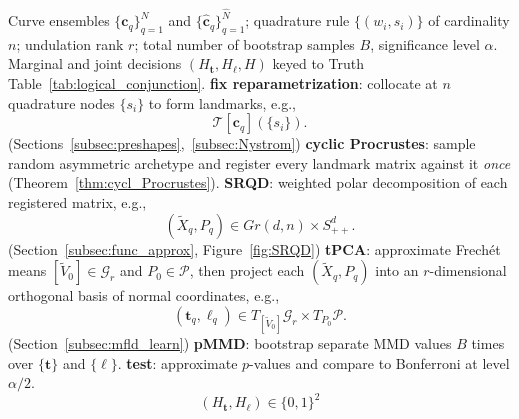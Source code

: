 \begin{algorithm}[ht]
\caption{Pseudo-code for explainable binary classification of separable shape ensembles.}
\label{alg:pipeline}
\begin{algorithmic}[1]
\Require Curve ensembles $\lbrace \boldsymbol{c}_q \rbrace_{q=1}^{N}$ and $\lbrace \widehat{\boldsymbol{c}}_q \rbrace_{q=1}^{\widehat{N}}$; quadrature rule $\lbrace (w_i,s_i)\rbrace$ of cardinality $n$; undulation rank $r$; total number of bootstrap samples $B$, significance level $\alpha$.
\Ensure Marginal and joint decisions $(H_{\boldsymbol{t}}, H_{\boldsymbol{\ell}}, H)$ keyed to Truth Table~\ref{tab:logical_conjunction}.
\State \textbf{fix reparametrization}: collocate at $n$ quadrature nodes $\lbrace s_i \rbrace$ to form landmarks, e.g.,
$$
\mathcal{T}[\boldsymbol{c}_q](\lbrace s_i \rbrace).
$$ (Sections~\ref{subsec:preshapes},~\ref{subsec:Nystrom})
\State \textbf{cyclic Procrustes}: sample random asymmetric archetype and register every landmark matrix against it \emph{once} (Theorem~\ref{thm:cycl_Procrustes}).
\State \textbf{SRQD}: weighted polar decomposition of each registered matrix, e.g.,
$$
(\widetilde{X}_q, P_q) \in Gr(d,n)\times S^d_{++}.
$$ 
(Section~\ref{subsec:func_approx}, Figure~\ref{fig:SRQD})
\State \textbf{tPCA}: approximate Frech\'et means $[\widetilde{V}_0]\in\mathcal{G}_r$ and $P_0\in\mathcal{P}$, then project each $(\widetilde{X}_q, P_q)$ into an $r$-dimensional orthogonal basis of normal coordinates, e.g.,
$$
(\boldsymbol{t}_q, \boldsymbol{\ell}_q) \in T_{[\widetilde{V}_0]}\mathcal{G}_r \times T_{P_0}\mathcal{P}.
$$ 
(Section~\ref{subsec:mfld_learn})
\State \textbf{pMMD}: bootstrap separate MMD values $B$ times over $\lbrace \boldsymbol{t} \rbrace$ and $\lbrace \boldsymbol{\ell} \rbrace$.
\State \textbf{test}: approximate $p$-values and compare to Bonferroni at level $\alpha/2$. 
\State \Return $$(H_{\boldsymbol{t}}, H_{\boldsymbol{\ell}}) \in \lbrace 0,1 \rbrace^2$$
\end{algorithmic}
\end{algorithm}
